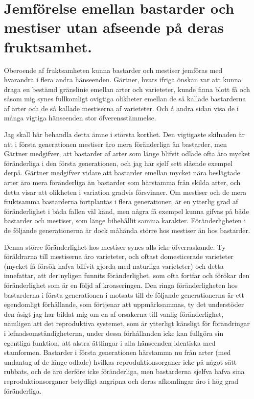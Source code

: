 \section[Bastarder och mestiser]{Jemförelse emellan bastarder och mestiser utan
afseende på deras fruktsamhet.}

Oberoende af fruktsamheten kunna bastarder och mestiser jemföras med hvarandra i flera andra hänseenden. Gärtner, hvars ifriga önskan var att kunna draga en bestämd gränslinie emellan arter och varieteter, kunde finna blott få och såsom mig synes fullkomligt ovigtiga olikheter emellan de så kallade bastarderna af arter och de så kallade mestiserna af varieteter. Och å andra sidan visa de i många vigtiga hänseenden stor öfverensstämmelse.

Jag skall här behandla detta ämne i största korthet. Den vigtigaste skilnaden är att i första generationen mestiser äro mera föränderliga än bastarder, men Gärtner medgifver, att bastarder af arter som länge blifvit odlade ofta äro mycket föränderliga i den första generationen, och jag har sjelf sett slående exempel derpå. Gärtner medgifver vidare att bastarder emellan mycket nära beslägtade arter äro mera föränderliga än bastarder som härstamma från skilda arter, och detta visar att olikheten i variation gradvis försvinner. Om mestiser och de mera fruktsamma bastarderna fortplantas i flera generationer, är en ytterlig grad af föränderlighet i båda fallen väl känd, men några få exempel kunna gifvas på både bastarder och mestiser, som länge bibehållit samma karakter. Föränderligheten i de följande generationerna är dock måhända större hos mestiser än hos bastarder.

Denna större föränderlighet hos mestiser synes alls icke öfverraskande. Ty föräldrarna till mestiserna äro varieteter, och oftast domesticerade varieteter (mycket få försök hafva blifvit gjorda med naturliga varieteter) och detta innefattar, att der nyligen funnits föränderlighet, som ofta fortfar och förökar den föränderlighet som är en följd af kroaseringen. Den ringa föränderligheten hos bastarderna i första generationen i motsats till de följande generationerna är ett egendomligt förhållande, som förtjenar att uppmärksammas, ty det understöder den åsigt jag har bildat mig om en af orsakerna till vanlig föränderlighet, nämligen att det reproduktiva systemet, som är ytterligt känsligt för förändringar i lefnadsomständigheterna, under dessa förhållanden icke kan fullgöra sin egentliga funktion, att alstra ättlingar i alla hänseenden identiska med stamformen. Bastarder i första generationen härstamma nu från arter (med undantag af de länge odlade) hvilkas reproduktionsorganer icke på något sätt rubbats, och de äro derföre icke föränderliga, men bastarderna sjelfva hafva sina reproduktionsorganer betydligt angripna och deras afkomlingar äro i hög grad föränderliga.

